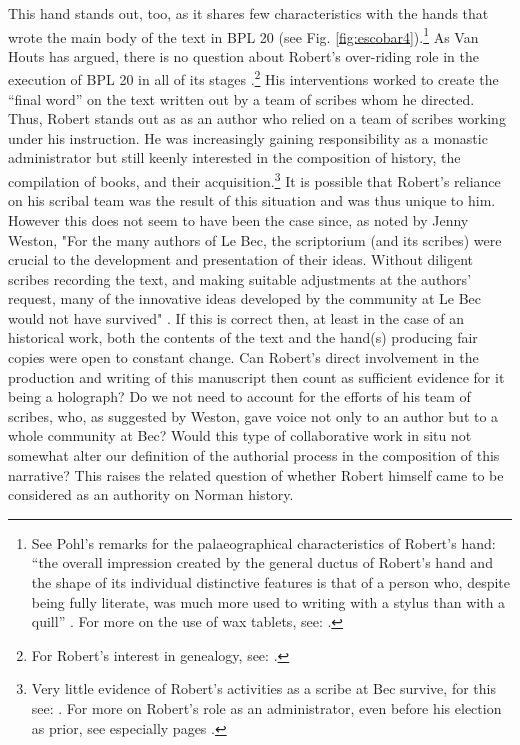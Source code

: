\begin{paper}
This hand stands out, too, as it shares few characteristics with the
hands that wrote the main body of the text in BPL 20 (see Fig.
\ref{fig:escobar4}).\footnote{See Pohl's remarks for the palaeographical characteristics
  of Robert's hand: ``the overall impression created by the general
  ductus of Robert's hand and the shape of its individual distinctive
  features is that of a person who, despite being fully literate, was
  much more used to writing with a stylus than with a quill'' \citep[76--77]{pohl_abbas_2014}. For more on the use of wax tablets, see: \cite{rouse_vocabulary_1990}.} As Van Houts has argued, there is no question about Robert's
over-riding role in the execution of BPL 20 in all of its stages \citep[cx]{van_houts_gesta_1992}.\footnote{For Robert's interest in genealogy, see: \cite{van_houts_robert_1989}.} His interventions worked to create the ``final word'' on
the text written out by a team of scribes whom he directed. Thus, Robert
stands out as as an author who relied on a team of scribes working under
his instruction. He was increasingly gaining responsibility as a
monastic administrator but still keenly interested in the composition of
history, the compilation of books, and their acquisition.\footnote{Very
  little evidence of Robert's activities as a scribe at Bec survive, for
  this see: \cite[105]{pohl_robert_2018}. For more on Robert's role as an
  administrator, even before his election as prior, see especially pages \cite[117--119]{pohl_robert_2018}.} It is possible that Robert's reliance on his scribal team
was the result of this situation and was thus unique to him. However
this does not seem to have been the case since, as noted by Jenny
Weston, "For the many authors of Le Bec, the scriptorium (and its
scribes) were crucial to the development and presentation of their
ideas. Without diligent scribes recording the text, and making suitable
adjustments at the authors' request, many of the innovative ideas
developed by the community at Le Bec would not have survived" \citep[159--160]{weston_manuscripts_2017}. If this is correct then, at least in the case of an
historical work, both the contents of the text and the hand(s) producing
fair copies were open to constant change. Can Robert's direct
involvement in the production and writing of this manuscript then count
as sufficient evidence for it being a holograph? Do we not need to
account for the efforts of his team of scribes, who, as suggested by
Weston, gave voice not only to an author but to a whole community at
Bec? Would this type of collaborative work in situ not somewhat alter
our definition of the authorial process in the composition of this
narrative? This raises the related question of whether Robert himself
came to be considered as an authority on Norman history.


\end{paper}
